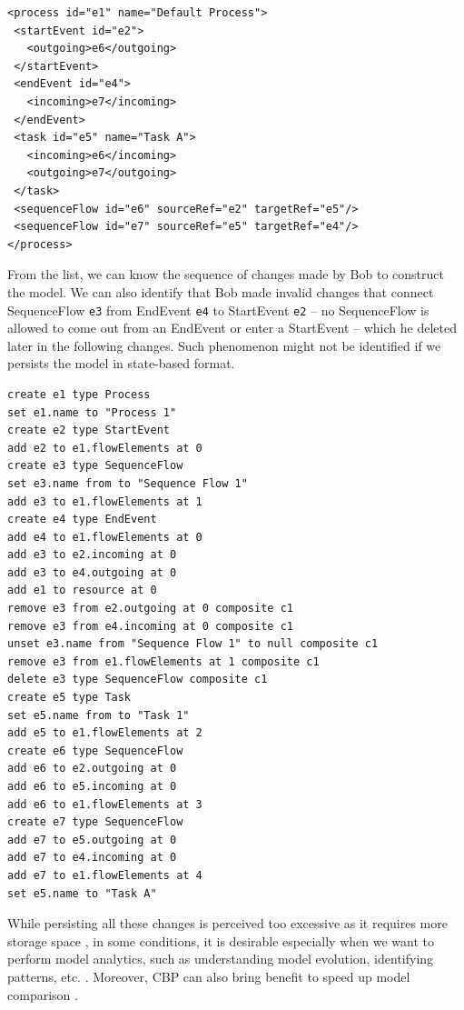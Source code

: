 \documentclass[conference]{IEEEtran}
\begin{document}
\vspace{-15pt}
\begin{lstlisting}[style=eol,numbersep=1pt,caption={A BPMN2 model in Fig. \ref{fig:bpmn2} persisted in simplified XMI.},label=lst:bpmn2_xmi]
<process id="e1" name="Default Process">
 <startEvent id="e2">
   <outgoing>e6</outgoing>
 </startEvent>
 <endEvent id="e4">
   <incoming>e7</incoming>
 </endEvent>
 <task id="e5" name="Task A">
   <incoming>e6</incoming>
   <outgoing>e7</outgoing>
 </task>
 <sequenceFlow id="e6" sourceRef="e2" targetRef="e5"/>
 <sequenceFlow id="e7" sourceRef="e5" targetRef="e4"/>
</process>
\end{lstlisting}

From the list, we can know the sequence of changes made by Bob to construct the model. We can also identify that Bob made invalid changes 
that connect SequenceFlow \texttt{e3} from EndEvent \texttt{e4} to StartEvent \texttt{e2}
-- no SequenceFlow is allowed to come out from an EndEvent or enter a StartEvent -- which he deleted later in the following changes. 
Such phenomenon might not be identified if we persists the model in state-based format. 

\vspace{-15pt}
\begin{lstlisting}[style=eol,numbersep=5pt,caption={The pseudo-formatted CBP of the model in Fig. \ref{fig:bpmn2}.},label=lst:bpmn2_cbp]
create e1 type Process
set e1.name to "Process 1"
create e2 type StartEvent
add e2 to e1.flowElements at 0
create e3 type SequenceFlow
set e3.name from to "Sequence Flow 1"
add e3 to e1.flowElements at 1
create e4 type EndEvent
add e4 to e1.flowElements at 0
add e3 to e2.incoming at 0
add e3 to e4.outgoing at 0
add e1 to resource at 0
remove e3 from e2.outgoing at 0 composite c1
remove e3 from e4.incoming at 0 composite c1
unset e3.name from "Sequence Flow 1" to null composite c1
remove e3 from e1.flowElements at 1 composite c1
delete e3 type SequenceFlow composite c1
create e5 type Task
set e5.name from to "Task 1"
add e5 to e1.flowElements at 2
create e6 type SequenceFlow
add e6 to e2.outgoing at 0
add e6 to e5.incoming at 0
add e6 to e1.flowElements at 3
create e7 type SequenceFlow
add e7 to e5.outgoing at 0
add e7 to e4.incoming at 0
add e7 to e1.flowElements at 4
set e5.name to "Task A"
\end{lstlisting}

While persisting all these changes is perceived too excessive as it requires more storage space \cite{DBLP:conf/models/YohannisRPK18}, 
in some conditions, it is desirable especially when we want to perform model analytics, 
such as understanding model evolution, identifying patterns, etc. \cite{DBLP:conf/models/YohannisKP17}. 
Moreover, CBP can also bring benefit to speed up model comparison \cite{yohannis2018efficient}.
\end{document}
